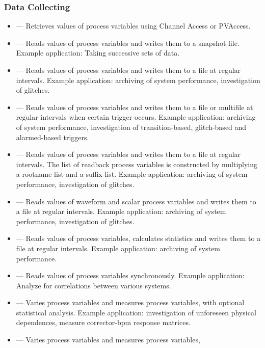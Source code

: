 \documentclass[11pt]{article}
\begin{document}
\subsubsection{Data Collecting}
\begin{itemize}
  \item {} --- Retrieves values of process variables using Channel Access or PVAccess.
  \item {} --- Reads values of process variables and writes them to a snapshot file.
        Example application: Taking successive sets of data.
  \item {} --- Reads values of process variables and writes them to a file at regular intervals.
        Example application: archiving of system performance, investigation of glitches.
  \item {} --- Reads values of process variables and writes them to a file or multifile at regular intervals when certain trigger occurs.
        Example application: archiving of system performance, investigation of
        transition-based, glitch-based and alarmed-based triggers.
  \item {} --- Reads values of process variables
        and writes them to a file at regular intervals. The list of readback process
        variables is constructed by multiplying a rootname list and a suffix list.
        Example application: archiving of system performance, investigation of
        glitches.
  \item {} --- Reads values of waveform and scalar process variables and writes them to a file at regular intervals.
        Example application: archiving of system performance, investigation of glitches.
  \item {} --- Reads values of process variables, calculates statistics and writes them to a file at regular intervals.
        Example application: archiving of system performance.
  \item {} --- Reads values of process variables
        synchronously.  Example application: Analyze for correlations
        between various systems.
  \item {} --- Varies process variables and measures process variables,
        with optional statistical analysis.
        Example application:  investigation of unforeseen physical dependences,
        measure corrector-bpm response matrices.
  \item {} --- Varies process variables and measures process variables,

\end{itemize}
\end{document}
